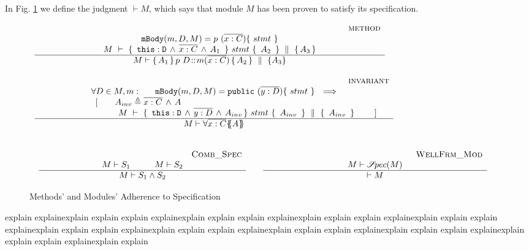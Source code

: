 {In Fig. \ref{f:wf} we  define the judgment $\vdash M$, which says that module $M$ has been proven to satisfy its specification.



\begin{figure}[thb]
$
\begin{array}{l}
\inferruleSD 
{~ \strut \hspace{6.5cm} {\sc{method}}}
{  
 \prg{mBody}(m,D,M)=p \ (\overline{x:C})\{\  stmt \ \}  %
    \\
  {\hprovesN{M} { \ \prg{this}:\prg{D}\, \wedge\, \overline{x:C}\, \wedge\, A_1\  } {\ stmt\ } {\ A_2 \ }   {A_3} } 
}
{
M \vdash {\mprepostN {A_1}{p\ D}{m}{x}{C}{A_2} {A_3} }
}
\\
\\
\inferruleSD 
{~ \strut \hspace{6.5cm} {\sc{invariant}}}
{  
\forall  D\in M,  m:\ \ \  \ \  \prg{mBody}(m,D,M)=\prg{public} \ (\overline{y:D})\{\  stmt \ \}      \ \ \Longrightarrow  
    \\
    \begin{array}{l}
   ~ \strut \hspace{1.7cm}[ \ \ \ \  \ \ A_{inv} \triangleq \overline{x:C}\, \wedge\, A
  \\
  ~ \strut \hspace{1.7cm} \ \ \ \ \  \ \ \  {\hprovesN{M} { \ \prg{this}:\prg{D}\, \wedge\, \overline{y:D}\, \wedge\,  A_{inv} } {\ stmt\ } {\ A_{inv}\ } {\ A_{inv} \ }  } \ \ \ \ \  \ \ ]
\end{array}
}
{
M \vdash \TwoStatesN{ \overline{x:C}} {A}
}
\\
\\
\\
\begin{array}{lcl}
\inferruleSD 
{~ \strut   {\sc{Comb\_Spec}}}
{  
M \vdash S_1 \hspace{1cm}  M \vdash S_2
}
{
M \vdash S_1 \wedge S_2
}
& &
\inferruleSD 
{~ \strut  {\sc{WellFrm\_Mod}}}
{  M \vdash \SpecOf {M}
}
{
\vdash M  
}
\end{array}
\end{array}
$
\caption{Methods' and Modules' Adherence to Specification}
\label{f:wf}
\end{figure}

explain explainexplain explain explain explainexplain explain explain explainexplain explain explain explainexplain explain
explain explainexplain explain explain explainexplain explain explain explainexplain explain explain explainexplain explain
explain explainexplain explain explain explainexplain explain

}
